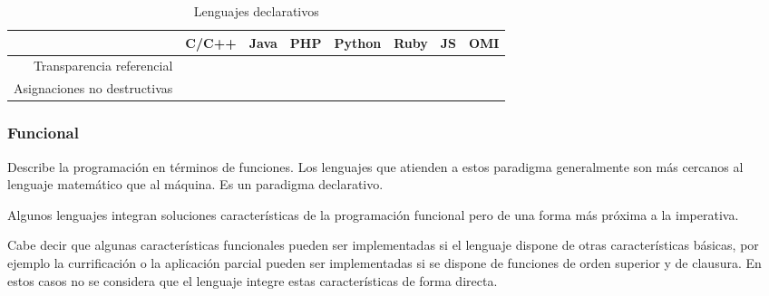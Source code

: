 \FloatBarrier
\begin{table}[h]
\begin{center}
\begin{tabular}{|r|c|c|c|c|c|c|c|} \hline
 & C/C++ & Java & PHP  & Python & Ruby & JS & OMI\\ \hline
Transparencia referencial & & &  &  &  &  &  \\ \hline
Asignaciones no destructivas & & &  &  &  &  &  \\ \hline
\end{tabular}
\end{center}
\caption{Lenguajes declarativos}
\end{table}
\FloatBarrier

\subsubsection {Funcional}
Describe la programación en términos de funciones. Los lenguajes que atienden a 
estos paradigma generalmente son más cercanos al lenguaje matemático que al máquina.
Es un paradigma declarativo. 

Algunos lenguajes integran soluciones características de la programación funcional pero de una forma más próxima a la imperativa.

Cabe decir que algunas características funcionales pueden ser implementadas 
si el lenguaje dispone de otras características básicas, 
por ejemplo la currificación o la aplicación parcial pueden 
ser implementadas si se dispone de funciones de orden superior y de clausura. En estos casos 
no se considera que el lenguaje integre estas características de forma directa.

